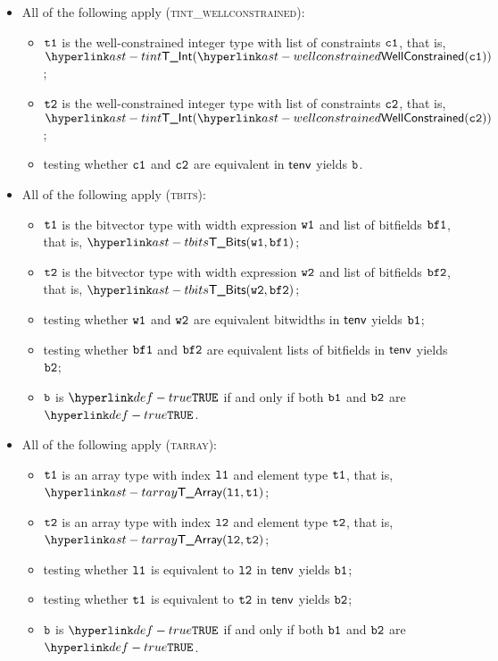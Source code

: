 \begin{itemize}
  \item All of the following apply (\textsc{tint\_wellconstrained}):
  \begin{itemize}
    \item $\texttt{t1}$ is the well-constrained integer type with list of constraints $\texttt{c1}$, that is, \\ $\TInt(\wellconstrained(\vcone))$;
    \item $\texttt{t2}$ is the well-constrained integer type with list of constraints $\texttt{c2}$, that is, \\ $\TInt(\wellconstrained(\vctwo))$;
    \item testing whether $\texttt{c1}$ and $\texttt{c2}$ are equivalent in $\textsf{tenv}$ yields $\texttt{b}$\ProseOrTypeError.
  \end{itemize}

  \item All of the following apply (\textsc{tbits}):
  \begin{itemize}
    \item $\texttt{t1}$ is the bitvector type with width expression $\texttt{w1}$ and list of bitfields $\texttt{bf1}$, that is, $\TBits(\vwone, \bfone)$;
    \item $\texttt{t2}$ is the bitvector type with width expression $\texttt{w2}$ and list of bitfields $\texttt{bf2}$, that is, $\TBits(\vwtwo, \bftwo)$;
    \item testing whether $\texttt{w1}$ and $\texttt{w2}$ are equivalent bitwidths in $\textsf{tenv}$ yields $\texttt{b1}$\ProseOrTypeError;
    \item testing whether $\texttt{bf1}$ and $\texttt{bf2}$ are equivalent lists of bitfields in $\textsf{tenv}$ yields $\texttt{b2}$\ProseOrTypeError;
    \item $\texttt{b}$ is $\True$ if and only if both $\texttt{b1}$ and $\texttt{b2}$ are $\True$.
  \end{itemize}

  \item All of the following apply (\textsc{tarray}):
  \begin{itemize}
    \item $\texttt{t1}$ is an array type with index $\texttt{l1}$ and element type $\texttt{t1}$, that is, $\TArray(\vlone, \vtone)$;
    \item $\texttt{t2}$ is an array type with index $\texttt{l2}$ and element type $\texttt{t2}$, that is, $\TArray(\vltwo, \vttwo)$;
    \item testing whether $\texttt{l1}$ is equivalent to $\texttt{l2}$ in $\textsf{tenv}$ yields $\texttt{b1}$\ProseOrTypeError;
    \item testing whether $\texttt{t1}$ is equivalent to $\texttt{t2}$ in $\textsf{tenv}$ yields $\texttt{b2}$\ProseOrTypeError;
    \item $\texttt{b}$ is $\True$ if and only if both $\texttt{b1}$ and $\texttt{b2}$ are $\True$.
  \end{itemize}


\end{itemize}

